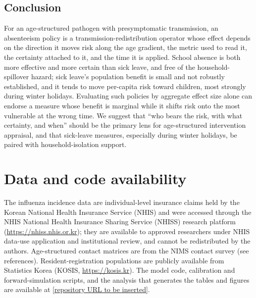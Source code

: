 \documentclass[12pt]{article}
\theoremstyle{plain}
\theoremstyle{remark}
\theoremstyle{definition}
\begin{document}
\subsection{Conclusion}
For an age-structured pathogen with presymptomatic transmission, an absenteeism policy is a transmission-redistribution operator whose effect depends on the direction it moves risk along the age gradient, the metric used to read it, the certainty attached to it, and the time it is applied. School absence is both more effective and more certain than sick leave, and free of the household-spillover hazard; sick leave's population benefit is small and not robustly established, and it tends to move per-capita risk toward children, most strongly during winter holidays. Evaluating such policies by aggregate effect size alone can endorse a measure whose benefit is marginal while it shifts risk onto the most vulnerable at the wrong time. We suggest that ``who bears the risk, with what certainty, and when'' should be the primary lens for age-structured intervention appraisal, and that sick-leave measures, especially during winter holidays, be paired with household-isolation support.

\section*{Data and code availability}
The influenza incidence data are individual-level insurance claims held by the
Korean National Health Insurance Service (NHIS) and were accessed through the
NHIS National Health Insurance Sharing Service (NHISS) research platform
(\url{https://nhiss.nhis.or.kr}); they are available to approved researchers
under NHIS data-use application and institutional review, and cannot be
redistributed by the authors. Age-structured contact matrices are from the NIMS
contact survey (see references). Resident-registration populations are publicly
available from Statistics Korea (KOSIS, \url{https://kosis.kr}). The model code,
calibration and forward-simulation scripts, and the analysis that generates the
tables and figures are available at
\href{https://github.com/}{[repository URL to be inserted]}.



\end{document}
